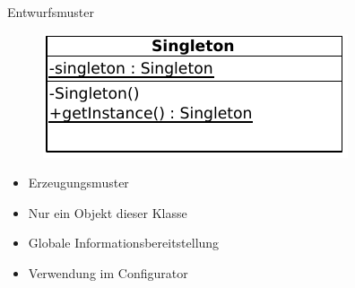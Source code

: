 \documentclass{beamer}
\begin{document}
\begin{frame}{Entwurfsmuster}
    \begin{minipage}[h]{0.45\textwidth}
        \begin{figure}[h!]
            \includegraphics[width=\textwidth]{singleton.pdf}
        \end{figure}
    \end{minipage}
    \hfill
    \begin{minipage}[h]{0.45\textwidth}
        \begin{itemize}
            \item Erzeugungsmuster
            \item Nur ein Objekt dieser Klasse
            \item Globale Informationsbereitstellung
            \item Verwendung im Configurator
        \end{itemize}
    \end{minipage}
\end{frame}
\end{document}
